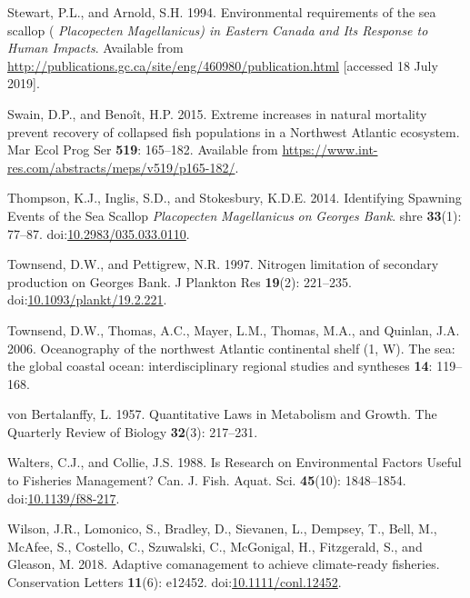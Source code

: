 \documentclass[
]{article}
\newlength{\cslhangindent}
\newlength{\cslentryspacingunit} %
\newenvironment{CSLReferences}[2] %
 {%
  \setlength{\parindent}{0pt}
  \ifodd #1
  \let\oldpar\par
  \def\par{\hangindent=\cslhangindent\oldpar}
  \fi
  \setlength{\parskip}{#2\cslentryspacingunit}
 }%
 {}
\begin{document}
\begin{CSLReferences}{1}{0}
\leavevmode{}%
Stewart, P.L., and Arnold, S.H. 1994. Environmental requirements of the sea scallop ( {\emph{Placopecten}}{ \emph{Magellanicus}}{\emph{\emph{) in Eastern}} }{\emph{\emph{Canada}}}{ \emph{\emph{and Its Response to Human Impacts}}}. Available from \url{http://publications.gc.ca/site/eng/460980/publication.html} {[}accessed 18 July 2019{]}.

\leavevmode{}%
Swain, D.P., and Benoît, H.P. 2015. Extreme increases in natural mortality prevent recovery of collapsed fish populations in a {Northwest Atlantic} ecosystem. Mar Ecol Prog Ser \textbf{519}: 165--182. Available from \url{https://www.int-res.com/abstracts/meps/v519/p165-182/}.

\leavevmode{}%
Thompson, K.J., Inglis, S.D., and Stokesbury, K.D.E. 2014. Identifying {Spawning Events} of the {Sea Scallop} {\emph{Placopecten}}{ \emph{Magellanicus}}{ \emph{\emph{on}} }{\emph{\emph{Georges Bank}}}. shre \textbf{33}(1): 77--87. doi:\href{https://doi.org/10.2983/035.033.0110}{10.2983/035.033.0110}.

\leavevmode{}%
Townsend, D.W., and Pettigrew, N.R. 1997. Nitrogen limitation of secondary production on {Georges Bank}. J Plankton Res \textbf{19}(2): 221--235. doi:\href{https://doi.org/10.1093/plankt/19.2.221}{10.1093/plankt/19.2.221}.

\leavevmode{}%
Townsend, D.W., Thomas, A.C., Mayer, L.M., Thomas, M.A., and Quinlan, J.A. 2006. Oceanography of the northwest {Atlantic} continental shelf (1, {W}). The sea: the global coastal ocean: interdisciplinary regional studies and syntheses \textbf{14}: 119--168.

\leavevmode{}%
von Bertalanffy, L. 1957. Quantitative {Laws} in {Metabolism} and {Growth}. The Quarterly Review of Biology \textbf{32}(3): 217--231.

\leavevmode{}%
Walters, C.J., and Collie, J.S. 1988. Is {Research} on {Environmental Factors Useful} to {Fisheries Management}? Can. J. Fish. Aquat. Sci. \textbf{45}(10): 1848--1854. doi:\href{https://doi.org/10.1139/f88-217}{10.1139/f88-217}.

\leavevmode{}%
Wilson, J.R., Lomonico, S., Bradley, D., Sievanen, L., Dempsey, T., Bell, M., McAfee, S., Costello, C., Szuwalski, C., McGonigal, H., Fitzgerald, S., and Gleason, M. 2018. Adaptive comanagement to achieve climate-ready fisheries. Conservation Letters \textbf{11}(6): e12452. doi:\href{https://doi.org/10.1111/conl.12452}{10.1111/conl.12452}.

\end{CSLReferences}
\end{document}
